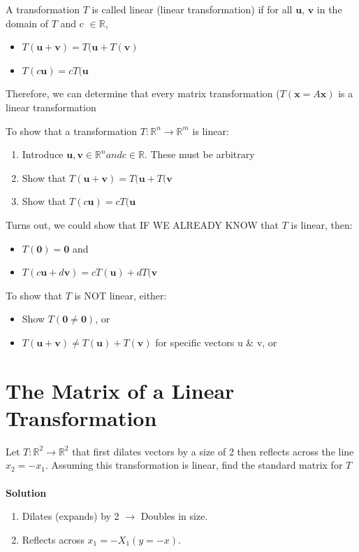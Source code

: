 \documentclass{report}
\begin{document}
\begin{definition}
A transformation $T$ is called linear (linear transformation) if for all $\mathbf{u}$, $\mathbf{v}$ in the domain of $T$ and c $\in \mathbb{R}$,
\begin{itemize}
	\item $T(\mathbf{u}+\mathbf{v}) = T(\mathbf{u} + T(\mathbf{v})$
	\item $T(c\mathbf{u}) = cT(\mathbf{u}$
\end{itemize}
Therefore, we can determine that every matrix transformation ($T(\mathbf{x} = A\mathbf{x})$ is a linear transformation
\end{definition}
To show that a transformation $T:\mathbb{R}^n \rightarrow \mathbb{R}^m$ is linear:
\begin{enumerate}
	\item Introduce $\mathbf{u}, \mathbf{v}\in\mathbb{R}^n and c\in\mathbb{R}.$ These must be arbitrary
	\item Show that $T(\mathbf{u}+\mathbf{v}) = T(\mathbf{u} + T(\mathbf{v}$
	\item Show that $T(c\mathbf{u}) = cT(\mathbf{u}$
\end{enumerate}
Turns out, we could show that IF WE ALREADY KNOW that $T$ is linear, then:
\begin{itemize}
	\item $T(\mathbf{0}) = \mathbf{0}$ and
	\item $T(c\mathbf{u}+d\mathbf{v}) = cT(\mathbf{u}) + dT(\mathbf{v}$
\end{itemize}
To show that $T$ is NOT linear, either:
\begin{itemize}
	\item Show $T(\mathbf{0}\neq\mathbf{0})$, or
	\item $T(\mathbf{u} + \mathbf{v}) \neq T(\mathbf{u}) + T(\mathbf{v})$ for specific vectors u \& v, or
\end{itemize}

\section{The Matrix of a Linear Transformation}

\begin{example}
Let $T:\mathbb{R}^2\rightarrow\mathbb{R}^2$ that first dilates vectors by a size of 2 then reflects across the line $x_2=-x_1$. Assuming this transformation is linear, find the standard matrix for $T$\\
\\
\textbf{Solution}
\begin{enumerate}
	\item Dilates (expands) by 2 $\rightarrow$ Doubles in size.
	\item Reflects across $x_1=-X_1 (y=-x)$.
\end{enumerate}
\end{example}
\end{document}
